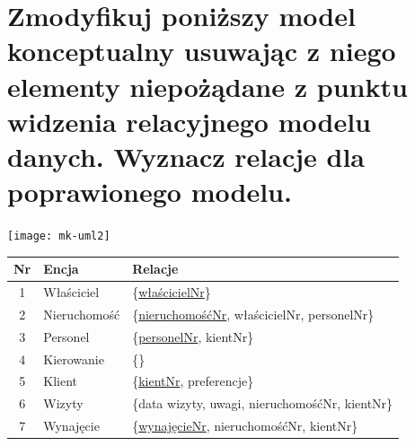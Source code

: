 \documentclass[a4paper,11pt]{article}
\begin{document}
\newpage
\section{Zmodyfikuj poniższy model konceptualny usuwając z niego elementy niepożądane z punktu widzenia relacyjnego modelu danych. Wyznacz relacje dla poprawionego modelu.}
\begin{center}
	\texttt{[image: mk-uml2]}
\end{center}

\vspace{5mm}

\resizebox{175mm}{75mm}{%

}

\vspace{5mm}

\begin{center}
  \begin{tabular}{|c|l|l|}
    \hline
    Nr & Encja & Relacje \\ \hline
    1 & Właściciel & \{\underline{właścicielNr}\} \\ \hline
    2 & Nieruchomość &\{\underline{nieruchomośćNr}, właścicielNr, personelNr\} \\ \hline
    3 & Personel & \{\underline{personelNr}, kientNr\} \\ \hline
    4 & Kierowanie & \{\} \\ \hline
    5 & Klient & \{\underline{kientNr}, preferencje\} \\ \hline
    6 & Wizyty & \{data wizyty, uwagi, nieruchomośćNr, kientNr\} \\ \hline
    7 & Wynajęcie & \{\underline{wynajęcieNr}, nieruchomośćNr, kientNr\} \\ \hline
  \end{tabular}
\end{center}
\end{document}
